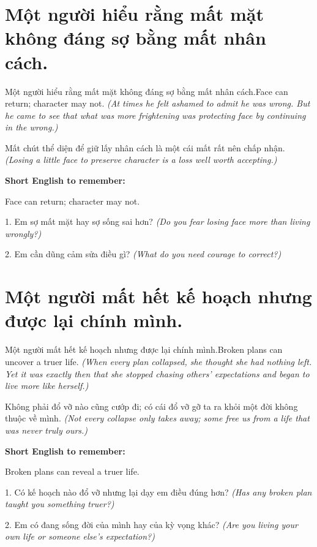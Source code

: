 \section{Một người hiểu rằng mất mặt không đáng sợ bằng mất nhân cách.}
\begin{truyen}{Một người hiểu rằng mất mặt không đáng sợ bằng mất nhân cách.}{Face can return; character may not.}
\textit{(At times he felt ashamed to admit he was wrong. But he came to see that what was more frightening was protecting face by continuing in the wrong.)}
\end{truyen}
\begin{baihoc}
Mất chút thể diện để giữ lấy nhân cách là một cái mất rất nên chấp nhận.
\textit{(Losing a little face to preserve character is a loss well worth accepting.)}
\end{baihoc}
\begin{ghinhoanh}\textbf{Short English to remember:}

Face can return; character may not.
\end{ghinhoanh}
\begin{tuhocnhanh}
1. Em sợ mất mặt hay sợ sống sai hơn? \textit{(Do you fear losing face more than living wrongly?)}

2. Em cần dũng cảm sửa điều gì? \textit{(What do you need courage to correct?)}
\end{tuhocnhanh}
\ngancach

\section{Một người mất hết kế hoạch nhưng được lại chính mình.}
\begin{truyen}{Một người mất hết kế hoạch nhưng được lại chính mình.}{Broken plans can uncover a truer life.}
\textit{(When every plan collapsed, she thought she had nothing left. Yet it was exactly then that she stopped chasing others' expectations and began to live more like herself.)}
\end{truyen}
\begin{baihoc}
Không phải đổ vỡ nào cũng cướp đi; có cái đổ vỡ gỡ ta ra khỏi một đời không thuộc về mình.
\textit{(Not every collapse only takes away; some free us from a life that was never truly ours.)}
\end{baihoc}
\begin{ghinhoanh}\textbf{Short English to remember:}

Broken plans can reveal a truer life.
\end{ghinhoanh}
\begin{tuhocnhanh}
1. Có kế hoạch nào đổ vỡ nhưng lại dạy em điều đúng hơn? \textit{(Has any broken plan taught you something truer?)}

2. Em có đang sống đời của mình hay của kỳ vọng khác? \textit{(Are you living your own life or someone else's expectation?)}
\end{tuhocnhanh}
\ngancach

